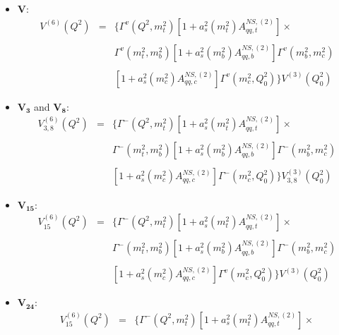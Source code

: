 \documentclass[10pt,a4paper]{article}
\begin{document}
\begin{itemize}
\item $\mathbf{V}$:
\begin{equation}
\begin{array}{rcl}
V^{(6)}(Q^2)&=&\displaystyle \Big\{\Gamma^{v}(Q^2,m_t^2)[1+a_s^2(m_t^2)A_{qq,t}^{N\!S,(2)}]\times\\
\\
 & &\displaystyle \Gamma^{v}(m_t^2,m_b^2)[1+a_s^2(m_b^2)A_{qq,b}^{N\!S,(2)}]\Gamma^{v}(m_b^2,m_c^2)\\
\\
& & \displaystyle[1+a_s^2(m_c^2)A_{qq,c}^{N\!S,(2)}]\Gamma^{v}(m_c^2,Q_0^2)\Big\}V^{(3)}(Q^2_0)
\end{array}
\end{equation}
\item $\mathbf{V_3}$ and $\mathbf{V_8}$:
\begin{equation}
\begin{array}{rcl}
V^{(6)}_{3,8}(Q^2)&=&\displaystyle \Big\{\Gamma^{-}(Q^2,m_t^2)[1+a_s^2(m_t^2)A_{qq,t}^{N\!S,(2)}]\times\\
\\
& & \displaystyle \Gamma^{-}(m_t^2,m_b^2)[1+a_s^2(m_b^2)A_{qq,b}^{N\!S,(2)}]\Gamma^{-}(m_b^2,m_c^2)\\
\\
& & \displaystyle [1+a_s^2(m_c^2)A_{qq,c}^{N\!S,(2)}]\Gamma^{-}(m_c^2,Q_0^2)\Big\}V^{(3)}_{3,8}(Q^2_0)
\end{array}
\end{equation}
\item $\mathbf{V_{15}}$:
\begin{equation}
\begin{array}{rcl}
V^{(6)}_{15}(Q^2)&=&\displaystyle \Big\{\Gamma^{-}(Q^2,m_t^2)[1+a_s^2(m_t^2)A_{qq,t}^{N\!S,(2)}]\times\\
\\
& & \displaystyle \Gamma^{-}(m_t^2,m_b^2)[1+a_s^2(m_b^2)A_{qq,b}^{N\!S,(2)}]\Gamma^{-}(m_b^2,m_c^2)\\ 
\\
& & \displaystyle [1+a_s^2(m_c^2)A_{qq,c}^{N\!S,(2)}]\Gamma^{v}(m_c^2,Q_0^2)\Big\}V^{(3)}(Q^2_0)
\end{array}
\end{equation}
\item $\mathbf{V_{24}}$:
\begin{equation}
\begin{array}{rcl}
V^{(6)}_{15}(Q^2)&=&\displaystyle \Big\{\Gamma^{-}(Q^2,m_t^2)[1+a_s^2(m_t^2)A_{qq,t}^{N\!S,(2)}]\times\\

\end{array}
\end{equation}
\end{itemize}
\end{document}
